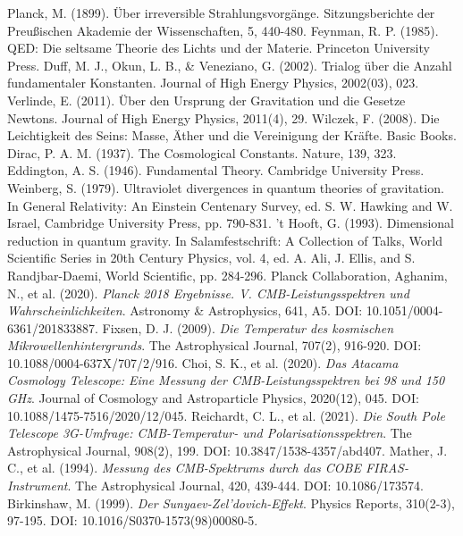 \documentclass[12pt,a4paper]{article}
\begin{document}
\begin{thebibliography}{99}
		 Planck, M. (1899). Über irreversible Strahlungsvorgänge. Sitzungsberichte der Preußischen Akademie der Wissenschaften, 5, 440-480.
		 Feynman, R. P. (1985). QED: Die seltsame Theorie des Lichts und der Materie. Princeton University Press.
		 Duff, M. J., Okun, L. B., \& Veneziano, G. (2002). Trialog über die Anzahl fundamentaler Konstanten. Journal of High Energy Physics, 2002(03), 023.
		 Verlinde, E. (2011). Über den Ursprung der Gravitation und die Gesetze Newtons. Journal of High Energy Physics, 2011(4), 29.
		 Wilczek, F. (2008). Die Leichtigkeit des Seins: Masse, Äther und die Vereinigung der Kräfte. Basic Books.
		 Dirac, P. A. M. (1937). The Cosmological Constants. Nature, 139, 323.
		 Eddington, A. S. (1946). Fundamental Theory. Cambridge University Press.
		 Weinberg, S. (1979). Ultraviolet divergences in quantum theories of gravitation. In General Relativity: An Einstein Centenary Survey, ed. S. W. Hawking and W. Israel, Cambridge University Press, pp. 790-831.
		 't Hooft, G. (1993). Dimensional reduction in quantum gravity. In Salamfestschrift: A Collection of Talks, World Scientific Series in 20th Century Physics, vol. 4, ed. A. Ali, J. Ellis, and S. Randjbar-Daemi, World Scientific, pp. 284-296.
		 Planck Collaboration, Aghanim, N., et al. (2020). \textit{Planck 2018 Ergebnisse. V. CMB-Leistungsspektren und Wahrscheinlichkeiten}. Astronomy \& Astrophysics, 641, A5. DOI: 10.1051/0004-6361/201833887.
		 Fixsen, D. J. (2009). \textit{Die Temperatur des kosmischen Mikrowellenhintergrunds}. The Astrophysical Journal, 707(2), 916-920. DOI: 10.1088/0004-637X/707/2/916.
		 Choi, S. K., et al. (2020). \textit{Das Atacama Cosmology Telescope: Eine Messung der CMB-Leistungsspektren bei 98 und 150 GHz}. Journal of Cosmology and Astroparticle Physics, 2020(12), 045. DOI: 10.1088/1475-7516/2020/12/045.
		 Reichardt, C. L., et al. (2021). \textit{Die South Pole Telescope 3G-Umfrage: CMB-Temperatur- und Polarisationsspektren}. The Astrophysical Journal, 908(2), 199. DOI: 10.3847/1538-4357/abd407.
		 Mather, J. C., et al. (1994). \textit{Messung des CMB-Spektrums durch das COBE FIRAS-Instrument}. The Astrophysical Journal, 420, 439-444. DOI: 10.1086/173574.
		 Birkinshaw, M. (1999). \textit{Der Sunyaev-Zel'dovich-Effekt}. Physics Reports, 310(2-3), 97-195. DOI: 10.1016/S0370-1573(98)00080-5.

\end{thebibliography}
\end{document}

